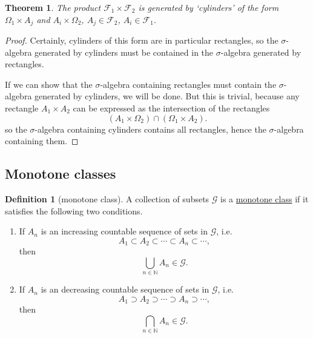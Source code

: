 \documentclass[a4paper,12pt]{scrreprt}
\newcommand{\N}{\mathbb{N}}
\newcommand{\defn}[1]{\ul{#1}}
\theoremstyle{definition}
\newtheorem{definition}{Definition}[section]
\theoremstyle{plain}
\newtheorem{theorem}{Theorem}[section]
\theoremstyle{remark}
\begin{document}
\begin{theorem}
  The product $\mathcal{F}_{1} \times \mathcal{F}_{2}$ is generated by `cylinders' of the form $\Omega_{1} \times A_{j}$ and $A_{i} \times \Omega_{2}$, $A_{j} \in \mathcal{F}_{2}$, $A_{i} \in \mathcal{F}_{1}$.
\end{theorem}
\begin{proof}
  Certainly, cylinders of this form are in particular rectangles, so the $\sigma$-algebra generated by cylinders must be contained in the $\sigma$-algebra generated by rectangles.

  If we can show that the $\sigma$-algebra containing rectangles must contain the $\sigma$-algebra generated by cylinders, we will be done. But this is trivial, because any rectangle $A_{1} \times A_{2}$ can be expressed as the intersection of the rectangles
  \begin{equation*}
    (A_{1} \times \Omega_{2}) \cap (\Omega_{1} \times A_{2}).
  \end{equation*}
  so the $\sigma$-algebra containing cylinders contains all rectangles, hence the $\sigma$-algebra containing them.
\end{proof}

\subsection{Monotone classes}

\begin{definition}[monotone class]
  \label{def:monotoneclass}
  A collection of subsets $\mathcal{G}$ is a \defn{monotone class} if it satisfies the following two conditions.
  \begin{enumerate}
    \item If $A_{n}$ is an increasing countable sequence of sets in $\mathcal{G}$, i.e.\
      \begin{equation*}
        A_{1} \subset A_{2} \subset \cdots \subset A_{n} \subset \cdots,
      \end{equation*}
      then
      \begin{equation*}
        \bigcup_{n \in \N} A_{n} \in \mathcal{G}.
      \end{equation*}

    \item If $A_{n}$ is an decreasing countable sequence of sets in $\mathcal{G}$, i.e.\
      \begin{equation*}
        A_{1} \supset A_{2} \supset \cdots \supset A_{n} \supset \cdots,
      \end{equation*}
      then
      \begin{equation*}
        \bigcap_{n \in \N} A_{n} \in \mathcal{G}.
      \end{equation*}
  \end{enumerate}
\end{definition}
\end{document}
